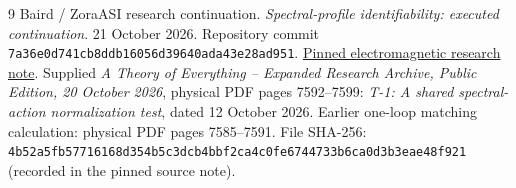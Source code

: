 \documentclass[11pt,letterpaper]{article}
\newcommand{\sourceurl}{https://github.com/Cbaird26/mqgt-scf-continued/blob/7a36e0d741cb8ddb16056d39640ada43e28ad951/research_continuation/2026-10-21/electromagnetic/RESEARCH_NOTE.md}
\begin{document}
\begin{thebibliography}{9}
 Baird / ZoraASI research continuation. \emph{Spectral-profile identifiability: executed continuation}. 21 October 2026. Repository commit \texttt{7a36e0d741cb8ddb16056d39640ada43e28ad951}. \href{\sourceurl}{Pinned electromagnetic research note}.
 Supplied \emph{A Theory of Everything -- Expanded Research Archive, Public Edition, 20 October 2026}, physical PDF pages 7592--7599: \emph{T-1: A shared spectral-action normalization test}, dated 12 October 2026. Earlier one-loop matching calculation: physical PDF pages 7585--7591. File SHA-256: \texttt{4b52a5fb57716168d354b5c3dcb4bbf2ca4c0fe6744733b6ca0d3b3eae48f921} (recorded in the pinned source note).
\end{thebibliography}
\end{document}
